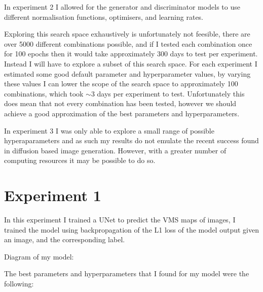 \documentclass{UoYCSproject}
\begin{document}
In experiment 2 I allowed for the generator and discriminator models to use different normalisation functions, optimisers, and learning rates. 


Exploring this search space exhaustively is unfortunately not feesible, there are over 5000 different combinations possible, and if I tested each combination once for 100 epochs then it would take approximately 300 days to test per experiment.
Instead I will have to explore a subset of this search space. For each experiment I estimated some good default parameter and hyperparameter values, by varying these values I can lower the scope of the search space to 
approximately 100 combinations, which took \(\sim\)3 days per experiment to test. Unfortunately this does mean that not every combination has been tested, however we should achieve a good approximation of the best parameters and hyperparameters.


In experiment 3 I was only able to explore a small range of possible hyperaparameters and as such my results do not emulate the recent success found in diffusion based image generation.
However, with a greater number of computing resources it may be possible to do so.

\section{Experiment 1}

In this experiment I trained a UNet to predict the VMS maps of images, I trained the model using backpropagation of the L1 loss of the model output given an image, and the corresponding label. 


Diagram of my model:

The best parameters and hyperparameters that I found for my model were the following:
\end{document}
